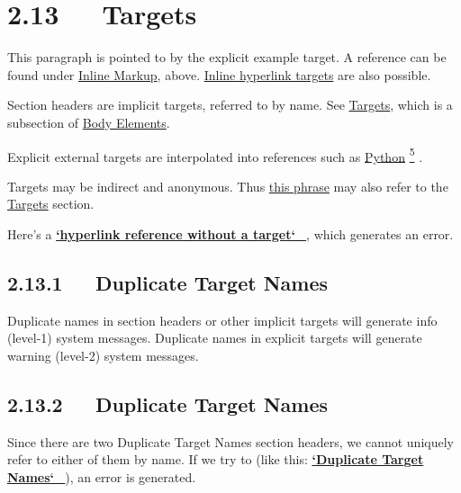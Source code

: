 \documentclass[a4paper]{memoir}
\providecommand*{\DUfootnotemark}[3]{%
  \raisebox{1em}{\hypertarget{#1}{}}%
  \hyperlink{#2}{\textsuperscript{#3}}%
}
\begin{document}
\section{2.13   Targets%
  \label{targets}%
  \label{another-target}%
}

\label{example}
This paragraph is pointed to by the explicit \textquotedbl{}example\textquotedbl{} target. A
reference can be found under \hyperref[inline-markup]{Inline Markup}, above. \hyperref[inline-hyperlink-targets]{Inline
hyperlink targets} are also possible.

Section headers are implicit targets, referred to by name. See
\hyperref[targets]{Targets}, which is a subsection of \hyperref[body-elements]{Body Elements}.

Explicit external targets are interpolated into references such as
\textquotedbl{}\href{http://www.python.org/}{Python}\DUfootnotemark{footnote-reference-11}{footnote-6}{5}\textquotedbl{}.

Targets may be indirect and anonymous.  Thus \hyperref[targets]{this phrase} may also
refer to the \hyperref[targets]{Targets} section.

Here's a %
\hyperlink{system-message-4}{\textbf{\color{red}`hyperlink reference without a target`\_}}, which generates an
error.


\subsection{2.13.1   Duplicate Target Names%
  \label{duplicate-target-names}%
}

Duplicate names in section headers or other implicit targets will
generate \textquotedbl{}info\textquotedbl{} (level-1) system messages.  Duplicate names in
explicit targets will generate \textquotedbl{}warning\textquotedbl{} (level-2) system messages.


\subsection{2.13.2   Duplicate Target Names%
  \label{duplicate-target-names-1}%
}

Since there are two \textquotedbl{}Duplicate Target Names\textquotedbl{} section headers, we
cannot uniquely refer to either of them by name.  If we try to (like
this: %
\hyperlink{system-message-5}{\textbf{\color{red}`Duplicate Target Names`\_}}), an error is generated.
\end{document}

